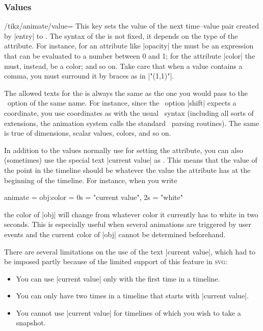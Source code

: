 \subsubsection{Values}
\label{section-anim-def-values}

\begin{key}{/tikz/animate/value=}
    This key sets the value of the next time--value pair created by |entry| to
    . The syntax of the  is not fixed, it depends on
    the type of the attribute. For instance, for an attribute like |opacity|
    the  must be an expression that can be evaluated to a number
    between 0 and 1; for the attribute |color| the  must, instead,
    be a color; and so on. Take care that when a value contains a comma, you
    must surround it by braces as in |"{(1,1)}"|.

    The allowed texts for the  is always the same as the one you
    would pass to the \tikzname\ option of the same name. For instance, since
    the \tikzname\ option |shift| expects a coordinate, you use coordinates as
     with the usual \tikzname\ syntax (including all sorts of
    extensions, the animation system calls the standard \tikzname\ parsing
    routines). The same is true of dimensions, scalar values, colors, and so
    on.

    In addition to the values normally use for setting the attribute, you can
    also (sometimes) use the special text |current value| as . This
    means that the value of the point in the timeline should be whatever the
    value the attribute has at the beginning of the timeline. For instance,
    when you write
\begin{codeexample}
animate = { obj:color = { 0s = "current value", 2s = "white" } }
\end{codeexample}
    the color of |obj| will change from whatever color it currently has to
    white in two seconds. This is especially useful when several animations are
    triggered by user events and the current color of |obj| cannot be
    determined beforehand.

    There are several limitations on the use of the text |current value|, which
    had to be imposed partly because of the limited support of this feature in
    \textsc{svg}:
    \begin{itemize}
        \item You can use |current value| only with the first time in a
            timeline.
        \item You can only have two times in a timeline that starts with
            |current value|.
        \item You cannot use |current value| for timelines of which you wish to
            take a snapshot.
    \end{itemize}
\end{key}


